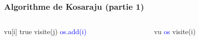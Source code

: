 \begin{frame}[fragile]
    \frametitle{Algorithme de Kosaraju (partie 1)}
        \begin{columns}
            \begin{column}{.5\textwidth}
                \begin{algorithmic}[1]
                    \State vu[i] \gets true
                            \State visite(j)
                        \EndIf
                    \EndFor
                    \State \textcolor{blue}{os.add(i)}
                    \EndFunction
                \end{algorithmic}
            \end{column}
            \begin{column}{.5\textwidth}
                \begin{algorithmic}[1]
                    \State vu 
                    \State \textcolor{blue}{os \gets []}
                        \State visite(i)
                        \EndIf
                    \EndFor
                    \end{algorithmic}            
            \end{column}
        \end{columns}    
    \end{frame}

